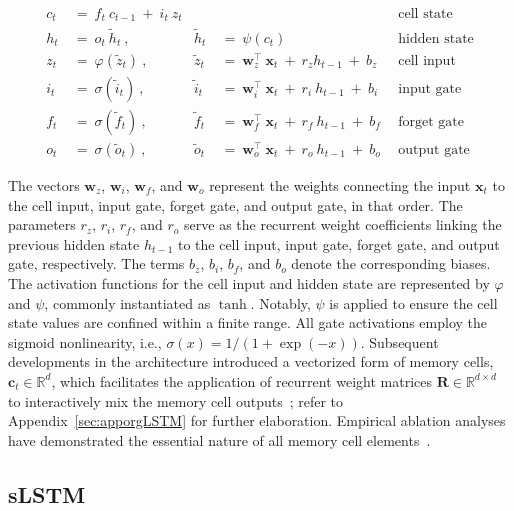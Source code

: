 \begin{align}
c_t \ &= \  f_t \ c_{t-1} \ + \ i_t \ z_t &  & &\text{cell state} \\
h_t  \ &= \ o_t \ \tilde{h}_t \ , & \tilde{h}_t \ &= \ \psi \left( c_t\right)
  &\text{hidden state} \\
z_t \ &= \ \varphi \left( \tilde{z}_t \right) \ , 
  &\tilde{z}_t \ &=  \ \mathbf{w}^\top_{z} \ \mathbf{x}_t \ + \
  r_{z}  h_{t-1} \ + \  b_{z} \ \
  &\text{cell input} \\
i_t \ &= \ \sigma \left( \tilde{i}_t  \right) \ , 
  &\tilde{i}_t \ &= \ \mathbf{w}^\top_{i} \ \mathbf{x}_t \ + \
  r_{i}  \ h_{t-1} \ + \  b_{i} \ \
  &\text{input gate} \\
f_t \ &= \ \sigma \left(  \tilde{f}_t \right) \ , 
  &\tilde{f}_t \ &= \ \mathbf{w}^\top_{f} \ \mathbf{x}_t  \ + \
  r_{f}  \ h_{t-1} \ + \  b_{f} \ \
  &\text{forget gate} \\
o_t \ &= \ \sigma \left( \tilde{o}_t \right) \ , 
  &\tilde{o}_t  \ &= \ \mathbf{w}^\top_{o} \ \mathbf{x}_t \ + \
  r_{o}  \ h_{t-1} \ + \  b_{o} \ \
  &\text{output gate} 
\end{align}

The vectors $\mathbf{w}_{z}$, $\mathbf{w}_{i}$, $\mathbf{w}_{f}$, and $\mathbf{w}_{o}$ represent the weights connecting the input $\mathbf{x}_t$ to the cell input, input gate, forget gate, and output gate, in that order. The parameters $r_{z}$, $r_{i}$, $r_{f}$, and $r_{o}$ serve as the recurrent weight coefficients linking the previous hidden state $h_{t-1}$ to the cell input, input gate, forget gate, and output gate, respectively. The terms $b_{z}$, $b_{i}$, $b_{f}$, and $b_{o}$ denote the corresponding biases. The activation functions for the cell input and hidden state are represented by $\varphi$ and $\psi$, commonly instantiated as $\tanh$. Notably, $\psi$ is applied to ensure the cell state values are confined within a finite range. All gate activations employ the sigmoid nonlinearity, i.e., $\sigma \left( x \right)= 1/(1+\exp(-x))$. Subsequent developments in the architecture introduced a vectorized form of memory cells, $\mathbf{c}_t \in \mathbb{R}^{d}$, which facilitates the application of recurrent weight matrices $\mathbf{R} \in \mathbb{R}^{d \times d}$ to interactively mix the memory cell outputs~\citep{Greff:15}; refer to Appendix~\ref{sec:apporgLSTM} for further elaboration. Empirical ablation analyses have demonstrated the essential nature of all memory cell elements~\citep{Greff:15}.

\subsection{sLSTM}
\label{sec:sLSTM}

